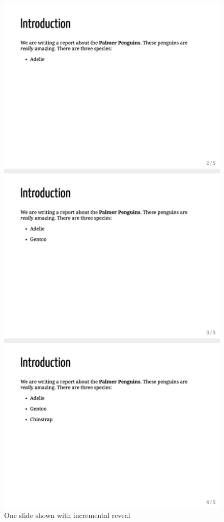 \documentclass[
]{book}
\begin{document}
\begin{figure}
\includegraphics[width=1\linewidth]{assets/incremental-reveal} \caption{One slide shown with incremental reveal}\label{fig:incremental-reveal}
\end{figure}
\end{document}

